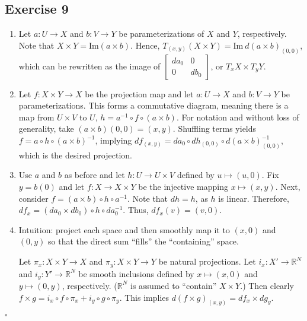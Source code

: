 \documentclass{article}
\begin{document}
\subsection*{Exercise 9}
\begin{enumerate}[label=(\arabic*)]
\item{
	Let $a\colon U\to X$ and $b\colon V\to Y$ be parameterizations
	of $X$ and $Y$, respectively.
	Note that $X\times Y = \text{Im}(a\times b)$.
	Hence, $T_{(x,y)}(X\times Y) =
		\text{Im}\ d(a\times b)_{(0,0)}$,
	which can be rewritten as the image of
	$\left[
		\begin{smallmatrix}
			da_0  & 0   \\
			0     & db_0
		\end{smallmatrix}
	\right]$,
	or $T_xX\times T_yY$.	
}
\item{
	Let $f\colon X\times Y\to X$ be the projection map and let
	$a\colon U\to X$ and $b\colon V\to Y$ be parameterizations.
	This forms a commutative diagram, meaning there is a map from
	$U\times V$ to $U$, $h=a^{-1}\circ f\circ (a\times b)$.
	For notation and without loss of generality, take
	$(a\times b)(0,0)=(x,y)$.
	Shuffling terms yields
	$f=a\circ h \circ (a\times b)^{-1}$, implying
	$df_{(x,y)}=da_0 \circ dh_{(0,0)}
		\circ d(a\times b)^{-1}_{(0,0)}$,
	which is the desired projection.
}
\item{
	Use $a$ and $b$ as before and let $h\colon U\to U\times V$
	defined by $u\mapsto(u,0)$. Fix $y=b(0)$ and let
	$f\colon X\to X\times Y$ be the injective mapping
	$x\mapsto(x,y)$.
	Next, consider $f=(a\times b)\circ h\circ a^{-1}$.
	Note that $dh=h$, as $h$ is linear.
	Therefore, $df_x=(da_0\times db_0)\circ h\circ da^{-1}_0$.
	Thus, $df_x(v)=(v,0)$.
}
\item{
	Intuition: project each space and then smoothly map it
	to $(x,0)$ and $(0,y)$ so that the direct sum ``fills'' the
	``containing'' space.
	
	Let $\pi_x\colon X\times Y\to X$ and
	$\pi_y\colon X\times Y\to Y$ be natural projections.
	Let $i_x\colon X'\to\mathbb{R}^N$ and
	$i_y\colon Y'\to\mathbb{R}^N$ be smooth inclusions
	defined by $x\mapsto(x,0)$ and $y\mapsto(0,y)$, respectively.
	($\mathbb{R}^N$ is assumed to ``contain'' $X\times Y$.)
	Then clearly $f\times g=i_x\circ f\circ \pi_x +
		i_y\circ g\circ\pi_y$.
	This implies $d(f\times g)_{(x,y)}=df_x\times dg_y$.
}
\end{enumerate}
\hfill $\square$
\end{document}

